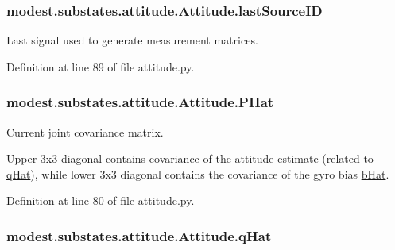 \subsubsection[{\texorpdfstring{last\+Source\+ID}{lastSourceID}}]{\setlength{\rightskip}{0pt plus 5cm}modest.\+substates.\+attitude.\+Attitude.\+last\+Source\+ID}\hypertarget{classmodest_1_1substates_1_1attitude_1_1Attitude_a0ec5bf8475ca5c175e4a516d2ac68fdf}{}\label{classmodest_1_1substates_1_1attitude_1_1Attitude_a0ec5bf8475ca5c175e4a516d2ac68fdf}


Last signal used to generate measurement matrices. 



Definition at line 89 of file attitude.\+py.

\subsubsection[{\texorpdfstring{P\+Hat}{PHat}}]{\setlength{\rightskip}{0pt plus 5cm}modest.\+substates.\+attitude.\+Attitude.\+P\+Hat}\hypertarget{classmodest_1_1substates_1_1attitude_1_1Attitude_a2f79616ca660e0cc1e628adf94738249}{}\label{classmodest_1_1substates_1_1attitude_1_1Attitude_a2f79616ca660e0cc1e628adf94738249}


Current joint covariance matrix. 

Upper 3x3 diagonal contains covariance of the attitude estimate (related to \hyperlink{classmodest_1_1substates_1_1attitude_1_1Attitude_a22a550534d908153baef2e52f7142c5e}{q\+Hat}), while lower 3x3 diagonal contains the covariance of the gyro bias \hyperlink{classmodest_1_1substates_1_1attitude_1_1Attitude_aac0bc92dc53893d2f190c1252690053c}{b\+Hat}. 

Definition at line 80 of file attitude.\+py.

\subsubsection[{\texorpdfstring{q\+Hat}{qHat}}]{\setlength{\rightskip}{0pt plus 5cm}modest.\+substates.\+attitude.\+Attitude.\+q\+Hat}\hypertarget{classmodest_1_1substates_1_1attitude_1_1Attitude_a22a550534d908153baef2e52f7142c5e}{}\label{classmodest_1_1substates_1_1attitude_1_1Attitude_a22a550534d908153baef2e52f7142c5e}


